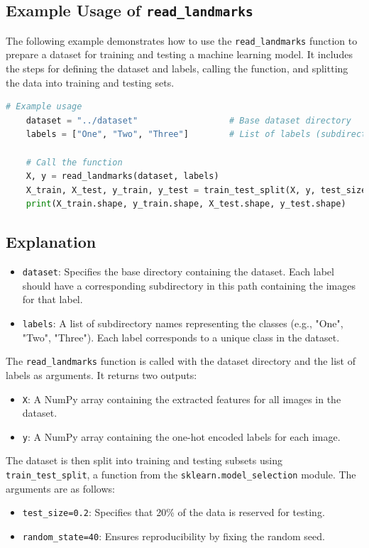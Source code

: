\subsection*{Example Usage of \texttt{read\_landmarks}}
The following example demonstrates how to use the \texttt{read\_landmarks} function to prepare a dataset for training and testing a machine learning model. It includes the steps for defining the dataset and labels, calling the function, and splitting the data into training and testing sets.

\begin{lstlisting}[language=Python, caption=Example Usage of \texttt{read\_landmarks}]
	# Example usage
	dataset = "../dataset"                  # Base dataset directory
	labels = ["One", "Two", "Three"]        # List of labels (subdirectories)
	
	# Call the function
	X, y = read_landmarks(dataset, labels)
	X_train, X_test, y_train, y_test = train_test_split(X, y, test_size=0.2, random_state=40)
	print(X_train.shape, y_train.shape, X_test.shape, y_test.shape)
\end{lstlisting}

\subsection*{Explanation}
\begin{itemize}
	\item \texttt{dataset}: Specifies the base directory containing the dataset. Each label should have a corresponding subdirectory in this path containing the images for that label.
	\item \texttt{labels}: A list of subdirectory names representing the classes (e.g., "One", "Two", "Three"). Each label corresponds to a unique class in the dataset.
\end{itemize}

The \texttt{read\_landmarks} function is called with the dataset directory and the list of labels as arguments. It returns two outputs:
\begin{itemize}
	\item \texttt{X}: A NumPy array containing the extracted features for all images in the dataset.
	\item \texttt{y}: A NumPy array containing the one-hot encoded labels for each image.
\end{itemize}

The dataset is then split into training and testing subsets using \texttt{train\_test\_split}, a function from the \texttt{sklearn.model\_selection} module. The arguments are as follows:
\begin{itemize}
	\item \texttt{test\_size=0.2}: Specifies that 20\% of the data is reserved for testing.
	\item \texttt{random\_state=40}: Ensures reproducibility by fixing the random seed.
\end{itemize}

